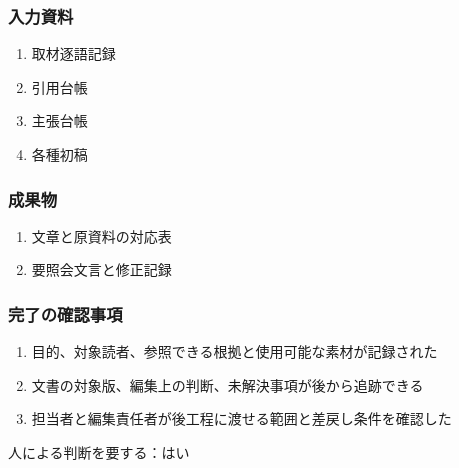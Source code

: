\documentclass[a4paper,11pt]{article}
\begin{document}
\subsubsection*{入力資料}
\begin{enumerate}[leftmargin=2em,itemsep=0.35em]
\item 取材逐語記録
\item 引用台帳
\item 主張台帳
\item 各種初稿
\end{enumerate}
\subsubsection*{成果物}
\begin{enumerate}[leftmargin=2em,itemsep=0.35em]
\item 文章と原資料の対応表
\item 要照会文言と修正記録
\end{enumerate}
\subsubsection*{完了の確認事項}
\begin{enumerate}[leftmargin=2em,itemsep=0.35em]
\item 目的、対象読者、参照できる根拠と使用可能な素材が記録された
\item 文書の対象版、編集上の判断、未解決事項が後から追跡できる
\item 担当者と編集責任者が後工程に渡せる範囲と差戻し条件を確認した
\end{enumerate}
\par 人による判断を要する：はい\par\medskip
\end{document}
